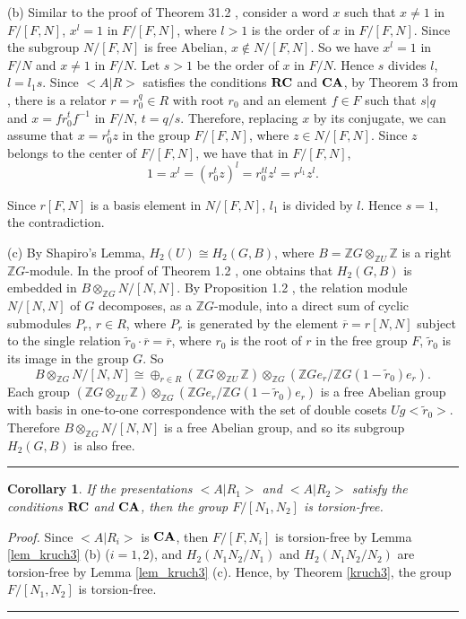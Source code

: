 \documentclass[12pt,reqno]{amsart}
\def\edvo{\rule {6pt}{6pt}}
\newtheorem{cor}{Corollary}
\begin{document}
(b) Similar to the proof of Theorem 31.2 \cite{olsh}, consider a word $x$ such that $x\neq 1$ in $F/[F,N]$, $x^l=1$ in $F/[F,N]$, where $l>1$ is the order of $x$ in $F/[F,N]$. Since the subgroup $N/[F,N]$ is free Abelian, $x\notin N/[F,N]$. So we have $x^l=1$ in $F/N$ and $x\neq 1$ in $F/N$. Let $s>1$ be the order of $x$ in $F/N$. Hence $s$ divides $l$, $l=l_1s$. Since $<A|R>$ satisfies the conditions $\bf RC$ and $\bf CA$, by Theorem 3 from \cite{huebschmann}, there is a relator $r=r_0^{q}\in R$ with root $r_0$ and an element $f\in F$ such that $s|q$ and $x=fr_0^{t}f^{-1}$ in $F/N$, $t=q/s$. Therefore, replacing $x$ by its conjugate, we can assume that $x=r_0^tz$ in the group $F/[F,N]$, where $z\in N/[F,N]$. Since $z$ belongs to the center of $F/[F,N]$, we have that in $F/[F,N]$,
$$1=x^l=(r_0^tz)^l=r_0^{tl}z^l=r^{l_1}z^l.$$

Since $r[F,N]$ is a basis element in $N/[F,N]$, $l_1$ is divided by $l$. Hence $s=1$, the contradiction.


(c) By Shapiro's Lemma, $H_2(U)\cong H_2(G, B)$, where $B=\mathbb{Z}G\otimes_{\mathbb{Z}U}\mathbb{Z}$ is a right $\mathbb{Z}G$-module. In the proof of Theorem 1.2 \cite{pride}, one obtains that $H_2(G, B)$ is embedded in $B\otimes_{\mathbb{Z}G}N/[N,N]$. By Proposition 1.2 \cite{chiswell}, the relation module $N/[N,N]$ of $G$ decomposes, as a $\mathbb{Z}G$-module, into a direct sum of cyclic submodules $P_r$, $r\in R$, where $P_r$ is generated by the element $\overline{r}=r[N,N]$ subject to the single relation $\widetilde{r}_0\cdot \overline{r}=\overline{r}$, where $r_0$ is the root of $r$ in the free group $F$, $\widetilde{r}_0$ is its image in the group $G$. So $$B\otimes_{\mathbb{Z}G}N/[N,N]\cong \oplus_{r\in R}(\mathbb{Z}G\otimes_{\mathbb{Z}U}\mathbb{Z})\otimes_{\mathbb{Z}G}(\mathbb{Z}Ge_r/\mathbb{Z}G(1-\widetilde{r}_0)e_r).$$
Each group $(\mathbb{Z}G\otimes_{\mathbb{Z}U}\mathbb{Z})\otimes_{\mathbb{Z}G}(\mathbb{Z}G e_r/\mathbb{Z}G(1-\widetilde{r}_0)e_r)$ is a free Abelian group with basis in one-to-one correspondence with the set of double cosets $Ug<\widetilde{r}_0>$. Therefore $B\otimes_{\mathbb{Z}G}N/[N,N]$ is a free Abelian group, and so its subgroup $H_2(G, B)$ is also free.
\edvo


\begin{cor}\label{cor1_kruch3}
 If the presentations $<A|R_1>$ and $<A|R_2>$ satisfy the conditions $\bf RC$ and $\bf CA$, then the group $F/[N_1,N_2]$ is torsion-free.
 \end{cor}
{\it Proof.}
Since $<A|R_i>$ is $\bf CA$, then $F/[F,N_i]$ is torsion-free by Lemma \ref{lem_kruch3} (b) ($i=1,2$), and $H_2(N_1N_2/N_1)$ and $H_2(N_1N_2/N_2)$
are torsion-free by Lemma \ref{lem_kruch3} (c). Hence, by Theorem  \ref{kruch3}, the group $F/[N_1,N_2]$ is torsion-free.
\edvo
\end{document}
